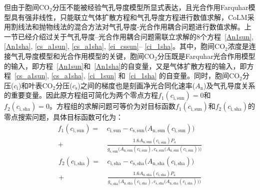 但由于胞间$\mathrm {CO_2}$分压不能被经验气孔导度模型所显式表达，且光合作用Farquhar模型具有强非线性，只能联立气体扩散方程和气孔导度方程进行数值求解，CoLM采用割线法和抛物线法的混合方法对气孔导度-光合作用耦合问题进行数值求解。上一节已经介绍过关于气孔导度--光合作用耦合问题需联立求解的8个方程~\eqref{An1sun}, \eqref{An1sha}, \eqref{cs_a1sun}, \eqref{cs_a1sha}, \eqref{ei_cssun}--%
\eqref{ci_1sha}。其中，胞间$\mathrm{CO_2}$浓度是连接气孔导度模型和光合作用模型的关键，胞间$\mathrm{CO_2}$分压既是Farquhar光合作用模型的输入，即方程~\eqref{An1sun}和~\eqref{An1sha}的自变量，又是气体扩散方程的输入，即方程~\eqref{cs_a1sun}, \eqref{cs_a1sha}, \eqref{ci_1sun} 和~\eqref{ci_1sha} 的自变量。同时，胞间$\mathrm{CO_2}$分压($c_{\mathrm{i}}$)和叶表$\mathrm{CO_2}$分压($c_{\mathrm{s}}$)之间的梯度也是刻画净光合同化速率($A_{\mathrm{n}}$)及气孔导度关系的重要变量。因此原方程组可简化为两个零点方程$f_1(c_{\mathrm{i,sun}})=0$和$f_2(c_{\mathrm{i,sha}})=0$。方程组的求解问题可等价为对目标函数$f_1(c_{\mathrm{i,sun}})$和$f_2(c_{\mathrm{i,sha}})$的零点搜索问题，具体目标函数可化为：
\begin{align}\label{f1_cisun}
f_{\mathrm{1}}\left(c_{\mathrm{i,sun}}\right)=&\,c_{\mathrm{i,sun}}-c_{\mathrm{s,sun}}\big(A_{\mathrm{n,sun}}\left(c_{\mathrm{i,sun}}\right)\big) \nonumber \\[1ex]
+& \, \frac{1.6A_{\mathrm{n,sun}}\left(c_{\mathrm{i,sun}}\right)P_{\mathrm {a}} }{g_{\mathrm{s,sun}}\Big(A_{\mathrm{n,sun}}\left(c_{\mathrm{i,sun}}\right),c_{\mathrm{s,sun}}\big(A_{\mathrm{n,sun}}\left(c_{\mathrm{i,sun}}\right)\big)\Big)}
\end{align}
\begin{align}\label{f1_cisha}
f_{\mathrm{2}}\left(c_{\mathrm{i,sha}}\right)=&\,c_{\mathrm{i,sha}}-c_{\mathrm{s,sha}}\big(A_{\mathrm{n,sha}}\left(c_{\mathrm{i,sha}}\right)\big) \nonumber \\[1ex]
+& \, \frac{1.6A_{\mathrm{n,sha}}\left(c_{\mathrm{i,sha}}\right)P_{\mathrm {a}} }{g_{\mathrm{s,sha}}\Big(A_{\mathrm{n,sha}}\left(c_{\mathrm{i,sha}}\right),c_{\mathrm{s,sha}}\big(A_{\mathrm{n,sha}}\left(c_{\mathrm{i,sha}}\right)\big)\Big)}
\end{align}

